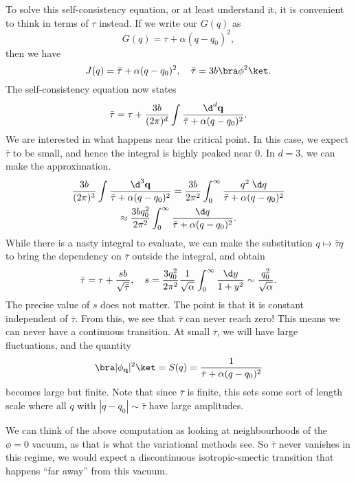 \documentclass[a4paper]{article}
\begin{document}
To solve this self-consistency equation, or at least understand it, it is convenient to think in terms of $\tau$ instead. If we write our $G(q)$ as
\[
  G(q) = \tau + \alpha(q - q_0)^2,
\]
then we have
\[
  J(q) = \bar{\tau} + \alpha (q - q_0)^2,\quad \bar{\tau} = 3b \bra \phi^2\ket.
\]
The self-consistency equation now states
\[
  \bar{\tau} = \tau + \frac{3b}{(2\pi)^d} \int \frac{\d^d \mathbf{q}}{\bar{\tau} + \alpha(q - q_0)^2}.
\]
We are interested in what happens near the critical point. In this case, we expect $\bar{\tau}$ to be small, and hence the integral is highly peaked near $0$. In $d = 3$, we can make the approximation.
\begin{multline*}
  \frac{3b}{(2\pi)^3} \int \frac{\d^3 \mathbf{q}}{\bar{\tau} + \alpha (q - q_0)^2} = \frac{3b}{2\pi^2} \int_0^\infty \frac{q^2\; \d q}{\bar{\tau} + \alpha (q - q_0)^2}\\
  \approx \frac{3bq_0^2}{2\pi^2} \int_0^\infty \frac{\d q}{\bar{\tau} + \alpha (q - q_0)^2}.
\end{multline*}
While there is a nasty integral to evaluate, we can make the substitution $q \mapsto \bar{\tau} q$ to bring the dependency on $\bar{\tau}$ outside the integral, and obtain
\[
  \bar{\tau} = \tau + \frac{sb}{\sqrt{\bar{\tau}}},\quad s = \frac{3q_0^2}{2\pi^2} \frac{1}{\sqrt{\alpha}} \int_0^\infty \frac{\d y}{1 + y^2} \sim \frac{q_0^2}{\sqrt{\alpha}}.
\]
The precise value of $s$ does not matter. The point is that it is constant independent of $\bar{\tau}$. From this, we see that $\bar{\tau}$ can never reach zero! This means we can never have a continuous transition. At small $\bar{\tau}$, we will have large fluctuations, and the quantity
\[
  \bra |\phi_\mathbf{q}|^2 \ket = S(q) = \frac{1}{\bar{\tau} + \alpha(q - q_0)^2}
\]
becomes large but finite. Note that since $\bar{\tau}$ is finite, this sets some sort of length scale where all $q$ with $|q - q_0| \sim \bar{\tau}$ have large amplitudes.

We can think of the above computation as looking at neighbourhoods of the $\phi = 0$ vacuum, as that is what the variational methods see. So $\bar{\tau}$ never vanishes in this regime, we would expect a discontinuous isotropic-smectic transition that happens ``far away'' from this vacuum.
\end{document}
